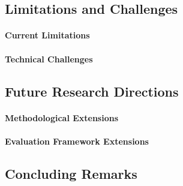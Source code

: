 \documentclass[runningheads]{llncs}
\begin{document}
\subsection{Limitations and Challenges}

\paragraph{Current Limitations}

\paragraph{Technical Challenges}

\subsection{Future Research Directions}

\paragraph{Methodological Extensions}

\paragraph{Evaluation Framework Extensions}

\subsection{Concluding Remarks}

\newpage



\end{document}
